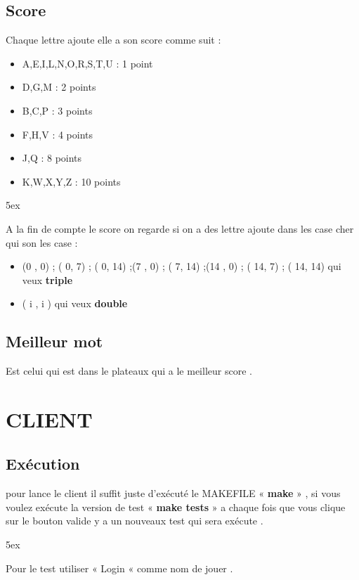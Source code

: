\documentclass[french]{article}
\begin{document}
\subsection{ Score }
    Chaque lettre ajoute elle a son score comme suit :
    
    \begin{itemize}
      \item A,E,I,L,N,O,R,S,T,U : 1 point 
      \item D,G,M : 2 points 
      \item B,C,P : 3 points 
      \item F,H,V : 4 points 
      \item J,Q : 8 points 
      \item K,W,X,Y,Z : 10 points
    \end{itemize}
   
\noindent
\setlength { \parindent } {5ex } 

    A la fin de compte le score on regarde si on a des lettre ajoute dans les case cher qui son les
case :

    \begin{itemize}
      \item  (0 , 0) ; ( 0, 7) ; ( 0, 14) ;(7 , 0) ; ( 7, 14) ;(14 , 0) ; ( 14, 7) ; ( 14, 14) qui veux \textbf{triple}
      \item  ( i , i ) qui veux \textbf{double}  
    \end{itemize}
    
   
    
\subsection{ Meilleur mot }
    Est celui qui est dans le plateaux qui a le meilleur score .

\section{ CLIENT }
\subsection{ Exécution }
    pour lance le client il suffit juste d’exécuté le MAKEFILE « \textbf{make} » , si vous voulez
exécute la version de test « \textbf{make tests} » a chaque fois que vous clique sur le bouton valide
y a un nouveaux test qui sera exécute .

\noindent
\setlength { \parindent } {5ex } 

Pour le test utiliser « Login « comme nom de jouer .
\end{document}
